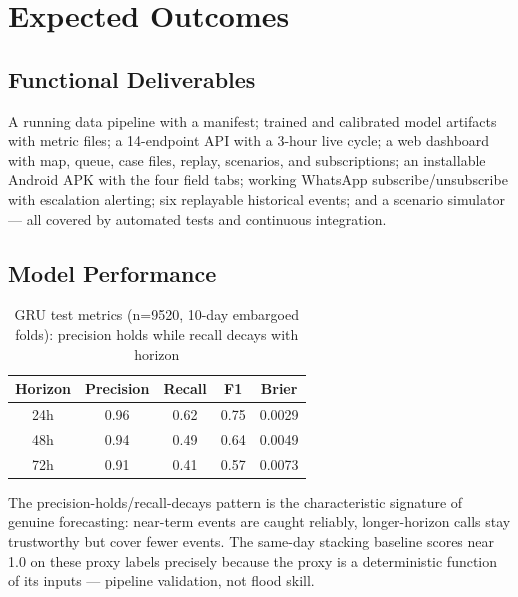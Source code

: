 \documentclass[a4paper,12pt]{report}
\begin{document}
\chapter{Expected Outcomes}
\section{Functional Deliverables}
A running data pipeline with a manifest; trained and calibrated model artifacts with metric files; a 14-endpoint API with a 3-hour live cycle; a web dashboard with map, queue, case files, replay, scenarios, and subscriptions; an installable Android APK with the four field tabs; working WhatsApp subscribe/unsubscribe with escalation alerting; six replayable historical events; and a scenario simulator --- all covered by automated tests and continuous integration.

\section{Model Performance}
\begin{table}[H]
\centering
\renewcommand{\arraystretch}{1.3}
\begin{tabularx}{\textwidth}{|c|cccc|}
\hline
\textbf{Horizon} & \textbf{Precision} & \textbf{Recall} & \textbf{F1} & \textbf{Brier} \\ \hline
24h & 0.96 & 0.62 & 0.75 & 0.0029 \\ \hline
48h & 0.94 & 0.49 & 0.64 & 0.0049 \\ \hline
72h & 0.91 & 0.41 & 0.57 & 0.0073 \\ \hline
\end{tabularx}
\caption{GRU test metrics (n=9520, 10-day embargoed folds): precision holds while recall decays with horizon}
\label{tab:metrics}
\end{table}

The precision-holds/recall-decays pattern is the characteristic signature of genuine forecasting: near-term events are caught reliably, longer-horizon calls stay trustworthy but cover fewer events. The same-day stacking baseline scores near 1.0 on these proxy labels precisely because the proxy is a deterministic function of its inputs --- pipeline validation, not flood skill.
\end{document}
